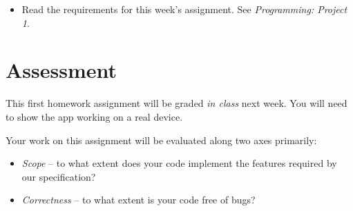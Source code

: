 \begin{itemize}
\item Read the requirements for this week's assignment. See \emph{Programming: Project 1}.

\end{itemize}

\chapter{Assessment}
\label{assessment}

This first homework assignment will be graded \emph{in class} next week. You will need to show the app working on a real device.

Your work on this assignment will be evaluated along two axes primarily:

\begin{itemize}
\item \emph{Scope} -- to what extent does your code implement the features required by our specification?

\item \emph{Correctness} -- to what extent is your code free of bugs?

\end{itemize}
